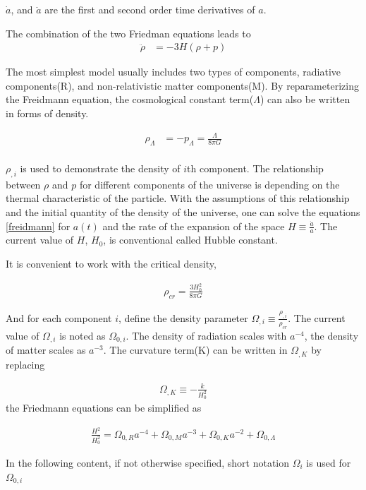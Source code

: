 $\dot{a}$, and $\ddot{a}$ are the first and second order time derivatives of $a$. 

The combination of the two Friedman equations leads to  
\begin{align}
\ddot{\rho}& = -3 H (\rho + p)
\end{align}

The most simplest model usually includes two types of components, radiative components(R), and non-relativistic matter components(M). By reparameterizing the Freidmann equation, the cosmological constant term($\Lambda$) can also be written in forms of density. 

\begin{align}
\rho_{\Lambda}& = -p_{\Lambda} = \frac{\Lambda}{8 \pi G}\\
\end{align}

$\rho_{,i}$ is used to demonstrate the density of $i$th component. The relationship between $\rho$ and $p$ for different components of the universe is depending on the thermal characteristic of the particle. With the assumptions of this relationship and the initial quantity of the density of the universe,  one can solve the equations \ref{freidmann} for $a(t)$ and the rate of the expansion of the space $H \equiv \frac{\dot{a}}{a}$. The current value of $H$, $H_0$, is conventional called Hubble constant. 

It is convenient to work with the critical density,

\begin{align}
\rho_{cr} = \frac{3 H_0^2}{8 \pi G}
\end{align}

And for each component $i$, define the density parameter $\Omega_{,i} \equiv \frac{\rho_{,i}}{\rho_{cr}}$. The current value of $\Omega_{,i}$ is noted as $\Omega_{0,i}$. The density of radiation scales with $a^{-4}$, the density of matter scales as $a^{-3}$. The curvature term(K) can be written in $\Omega_{,K}$ by replacing 

\begin{align}
\Omega_{,K} \equiv -\frac{k}{H_0^2}
\end{align}
the Friedmann equations can be simplified as

\begin{align}
\frac{H^2}{H_0^2}  = \Omega_{0,R} a^{-4} + \Omega_{0, M} a^{-3}+ \Omega_{0,K} a^{-2} + \Omega_{0,\Lambda}
\end{align}

In the following content, if not otherwise specified, short notation $\Omega_i$ is used for $\Omega_{0,i}$

